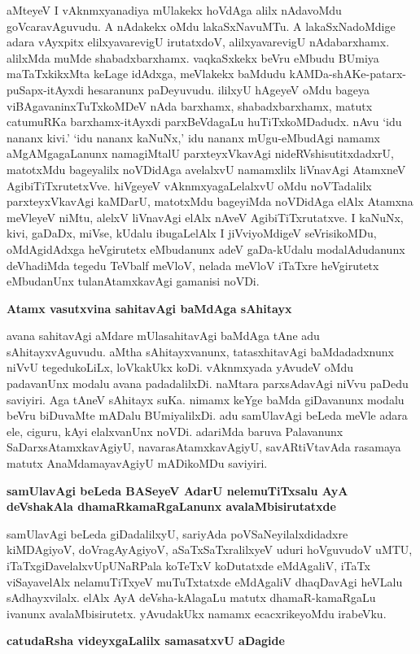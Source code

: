 aMteyeV I vAknmxyanadiya mUlakekx hoVdAga alilx nAdavoMdu goVcaravAguvudu. A nAdakekx oMdu lakaSxNavuMTu. A lakaSxNadoMdige adara vAyxpitx elilxyavarevigU irutatxdoV, alilxyavarevigU nAdabarxhamx. alilxMda muMde shabadxbarxhamx. vaqkaSxkekx beVru eMbudu BUmiya maTaTxkikxMta keLage idAdxga, meVlakekx baMdudu kAMDa-shAKe-patarx-puSapx-itAyxdi hesaranunx paDeyuvudu. ililxyU hAgeyeV oMdu bageya viBAgavaninxTuTxkoMDeV nAda barxhamx, shabadxbarxhamx, matutx catumuRKa barxhamx-itAyxdi parxBeVdagaLu huTiTxkoMDadudx. nAvu `idu nananx kivi.' `idu nananx kaNuNx,' idu nananx mUgu-eMbudAgi namamx aMgAMgagaLanunx namagiMtalU parxteyxVkavAgi nideRVshisutitxdadxrU, matotxMdu bageyalilx noVDidAga avelalxvU namamxlilx liVnavAgi AtamxneV AgibiTiTxrutetxVve. hiVgeyeV vAknmxyagaLelalxvU oMdu noVTadalilx parxteyxVkavAgi kaMDarU, matotxMdu bageyiMda noVDidAga elAlx Atamxna meVleyeV niMtu, alelxV liVnavAgi elAlx nAveV AgibiTiTxrutatxve. I kaNuNx, kivi, gaDaDx, miVse, kUdalu ibugaLelAlx I jiVviyoMdigeV seVrisikoMDu, oMdAgidAdxga heVgirutetx eMbudanunx adeV gaDa-kUdalu modalAdudanunx deVhadiMda tegedu TeVbalf meVloV, nelada meVloV iTaTxre heVgirutetx eMbudanUnx tulanAtamxkavAgi gamanisi noVDi.

\noindent
{\bf\large{Atamx vasutxvina sahitavAgi baMdAga sAhitayx}}\label{196}

avana sahitavAgi aMdare mUlasahitavAgi baMdAga tAne adu sAhitayxvAguvudu. aMtha sAhitayxvanunx, tatasxhitavAgi baMdadadxnunx niVvU tegedukoLiLx, loVkakUkx koDi. vAknmxyada yAvudeV oMdu padavanUnx modalu avana padadalilxDi. naMtara parxsAdavAgi niVvu paDedu saviyiri. Aga tAneV sAhitayx suKa. nimamx keYge baMda giDavanunx modalu beVru biDuvaMte mADalu BUmiyalilxDi. adu samUlavAgi beLeda meVle adara ele, ciguru, kAyi elalxvanUnx noVDi. adariMda baruva Palavanunx SaDarxsAtamxkavAgiyU, navarasAtamxkavAgiyU, savARtiVtavAda rasamaya matutx AnaMdamayavAgiyU mADikoMDu saviyiri.

\noindent
{\bf\large{samUlavAgi beLeda BASeyeV AdarU nelemuTiTxsalu AyA deVshakAla dhamaRkamaRgaLanunx avalaMbisirutatxde}}\label{page196}

samUlavAgi beLeda giDadalilxyU, sariyAda poVSaNeyilalxdidadxre kiMDAgiyoV, doVragAyAgiyoV, aSaTxSaTxralilxyeV uduri hoVguvudoV uMTU, iTaTxgiDavelalxvUpUNaRPala koTeTxV koDutatxde eMdAgaliV, iTaTx viSayavelAlx nelamuTiTxyeV muTuTxtatxde eMdAgaliV dhaqDavAgi heVLalu sAdhayxvilalx. elAlx AyA deVsha-kAlagaLu matutx dhamaR-kamaRgaLu ivanunx avalaMbisirutetx. yAvudakUkx namamx ecacxrikeyoMdu irabeVku.

\noindent
{\bf\large{catudaRsha videyxgaLalilx samasatxvU aDagide}}\label{page197}

